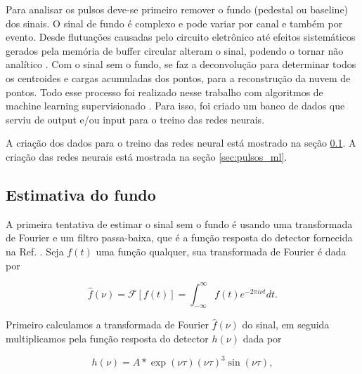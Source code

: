 \documentclass[a4paper,12pt,oneside]{book}
\DeclareMathOperator{\sinc}{sinc}
\begin{document}
\par Para analisar os pulsos deve-se primeiro remover o fundo (pedestal ou baseline) dos sinais. O sinal de fundo é complexo e pode variar por canal e também por evento. Desde flutuações causadas pelo circuito eletrônico até efeitos sistemáticos gerados pela memória de buffer circular alteram o sinal, podendo o tornar não analítico \cite{FORTINO2022166497, GET}. Com o sinal sem o fundo, se faz a deconvolução para determinar todos os centroides e cargas acumuladas dos pontos, para a reconstrução da nuvem de pontos. Todo esse processo foi realizado nesse trabalho com algoritmos de machine learning supervisionado \cite{FORTINO2022166497}. Para isso, foi criado um banco de dados que serviu de output e/ou input para o treino das redes neurais.

\par A criação dos dados para o treino das redes neural está mostrado na seção \ref{subsec:pulses_baseline}. A criação das redes neurais está mostrada na seção \ref{sec:pulsos_ml}. 


\subsection{Estimativa do fundo}\label{subsec:pulses_baseline}

\par A primeira tentativa de estimar o sinal sem o fundo é usando uma transformada de Fourier e um filtro passa-baixa, que é a função resposta do detector fornecida na Ref. \cite{GET}. Seja $f(t)$ uma função qualquer, sua transformada de Fourier é dada por

\begin{equation} \label{eq:fourier}
    \hat{f}(\nu)=\mathscr{F}[f(t)]=\int_{-\infty}^{\infty} f(t) e^{-2 \pi i \nu t} d t.
\end{equation}

\par Primeiro calculamos a transformada de Fourier $\hat{f}(\nu)$ do sinal, em seguida multiplicamos pela função resposta do detector $h(\nu)$ dada por \cite{GET}

\begin{equation}
    h(\nu) = A*\exp\left (\nu \tau \right)\left(\nu \tau\right)^3 \sin \left( \nu \tau \right) ,
\end{equation}

\end{document}
